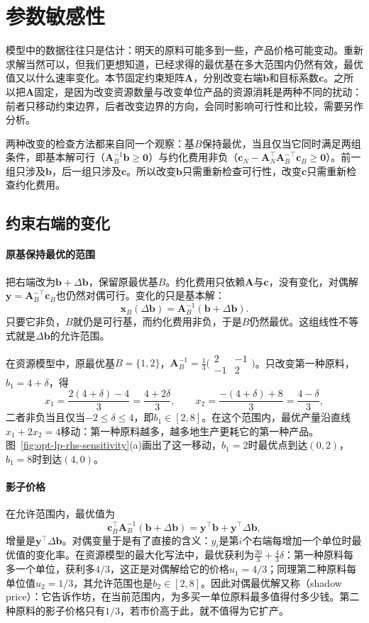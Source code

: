 \section{参数敏感性}
\label{sec:opt-lp-sensitivity}

模型中的数据往往只是估计：明天的原料可能多到一些，产品价格可能变动。重新求解当然可以，但我们更想知道，已经求得的最优基在多大范围内仍然有效，最优值又以什么速率变化。本节固定约束矩阵$\bm A$，分别改变右端$\bm b$和目标系数$\bm c$。之所以把$\bm A$固定，是因为改变资源数量与改变单位产品的资源消耗是两种不同的扰动：前者只移动约束边界，后者改变边界的方向，会同时影响可行性和比较，需要另作分析。

两种改变的检查方法都来自同一个观察：基$B$保持最优，当且仅当它同时满足两组条件，即基本解可行（$\bm A_B^{-1}\bm b\ge\bm 0$）与约化费用非负（$\bm c_N-\bm A_N^\top\bm A_B^{-\top}\bm c_B\ge\bm 0$）。前一组只涉及$\bm b$，后一组只涉及$\bm c$。所以改变$\bm b$只需重新检查可行性，改变$\bm c$只需重新检查约化费用。

\subsection{约束右端的变化}
\label{sec:opt-lp-rhs}

\paragraph{原基保持最优的范围}
把右端改为$\bm b+\Delta\bm b$，保留原最优基$B$。约化费用只依赖$\bm A$与$\bm c$，没有变化，对偶解$\bm y=\bm A_B^{-\top}\bm c_B$也仍然对偶可行。变化的只是基本解：
\[
  \bm x_B(\Delta\bm b)=\bm A_B^{-1}(\bm b+\Delta\bm b).
\]
只要它非负，$B$就仍是可行基，而约化费用非负，于是$B$仍然最优。这组线性不等式就是$\Delta\bm b$的允许范围。

在资源模型中，原最优基$B=\{1,2\}$，$\bm A_B^{-1}=\tfrac13\bigl(\begin{smallmatrix}2&-1\\-1&2\end{smallmatrix}\bigr)$。只改变第一种原料，$b_1=4+\delta$，得
\[
  x_1=\frac{2(4+\delta)-4}{3}=\frac{4+2\delta}{3},\qquad
  x_2=\frac{-(4+\delta)+8}{3}=\frac{4-\delta}{3},
\]
二者非负当且仅当$-2\le\delta\le4$，即$b_1\in[2,8]$。在这个范围内，最优产量沿直线$x_1+2x_2=4$移动：第一种原料越多，越多地生产更耗它的第一种产品。图~\ref{fig:opt-lp-rhs-sensitivity}(a)画出了这一移动，$b_1=2$时最优点到达$(0,2)$，$b_1=8$时到达$(4,0)$。

\paragraph{影子价格}
在允许范围内，最优值为
\[
  \bm c_B^\top\bm A_B^{-1}(\bm b+\Delta\bm b)=\bm y^\top\bm b+\bm y^\top\Delta\bm b,
\]
增量是$\bm y^\top\Delta\bm b$。对偶变量于是有了直接的含义：$y_i$是第$i$个右端每增加一个单位时最优值的变化率。在资源模型的最大化写法中，最优获利为$\tfrac{20}3+\tfrac43\delta$：第一种原料每多一个单位，获利多$4/3$，这正是对偶解给它的价格$u_1=4/3$；同理第二种原料每单位值$u_2=1/3$，其允许范围也是$b_2\in[2,8]$。因此对偶最优解又称（shadow price）：它告诉作坊，在当前范围内，为多买一单位原料最多值得付多少钱。第二种原料的影子价格只有$1/3$，若市价高于此，就不值得为它扩产。

